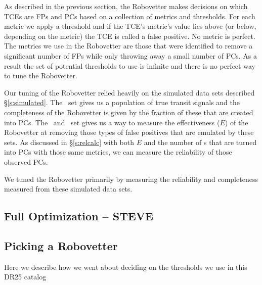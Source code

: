 \label{s:optimize}
As described in the previous section, the Robovetter makes decisions on which TCEs are FPs and PCs based on a collection of metrics and thresholds.  For each metric we apply a threshold and if the TCE's metric's value lies above (or below, depending on the metric) the TCE is called a false positive.  No metric is perfect.  The metrics we use in the Robovetter are those that were identified to remove a significant number of FPs while only throwing away a small number of PCs.  As a result the set of potential thresholds to use is infinite and there is no perfect way to tune the Robovetter.

Our tuning of the Robovetter relied heavily on the simulated data sets described \S\ref{s:simulated}. The \injtce\ set gives us a population of true transit signals and the completeness of the Robovetter is given by the fraction of these that are created into PCs.  The \scrtce\ and \invtce\ set gives us a way to measure the effectiveness ($E$) of the Robovetter at removing those types of false positives that are emulated by these sets. As discussed in \S\ref{s:relcalc} with both $E$ and the number of \opstce s that are turned into PCs with those same metrics, we can measure the reliability of those observed PCs.  

We tuned the Robovetter primarily by measuring the reliability and completeness measured from these simulated data sets. 

\subsection{Full Optimization -- STEVE}

\subsection{Picking a Robovetter}
Here we describe how we went about deciding on the thresholds we use in this DR25 catalog
